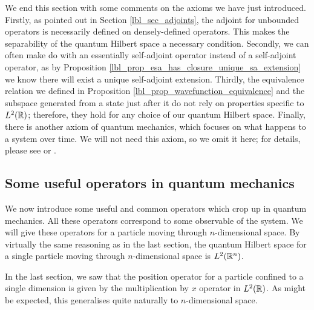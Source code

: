 We end this section with some comments on the axioms we have just introduced. Firstly, as pointed out in Section \eqref{lbl_sec_adjoints}, the adjoint for unbounded operators is necessarily defined on densely-defined operators. This makes the separability of the quantum Hilbert space a necessary condition. Secondly, we can often make do with an essentially self-adjoint operator instead of a self-adjoint operator, as by Proposition \eqref{lbl_prop_esa_has_closure_unique_sa_extension} we know there will exist a unique self-adjoint extension. Thirdly, the equivalence relation we defined in Proposition \eqref{lbl_prop_wavefunction_equivalence} and the subspace generated from a state just after it do not rely on properties specific to $L^2(\mathbb{R})$; therefore, they hold for any choice of our quantum Hilbert space. Finally, there is another axiom of quantum mechanics, which focuses on what happens to a system over time. We will not need this axiom, so we omit it here; for details, please see {\cite[p.57]{teschl}} or {\cite[p.71]{Hall2013}}.

\subsection{Some useful operators in quantum mechanics}

We now introduce some useful and common operators which crop up in quantum mechanics. All these operators correspond to some observable of the system. We will give these operators for a particle moving through $n$-dimensional space. By virtually the same reasoning as in the last section, the quantum Hilbert space for a single particle moving through $n$-dimensional space is $L^2(\mathbb{R}^n)$.

\medskip

In the last section, we saw that the position operator for a particle confined to a single dimension is given by the multiplication by $x$ operator in $L^2(\mathbb{R})$. As might be expected, this generalises quite naturally to $n$-dimensional space.

